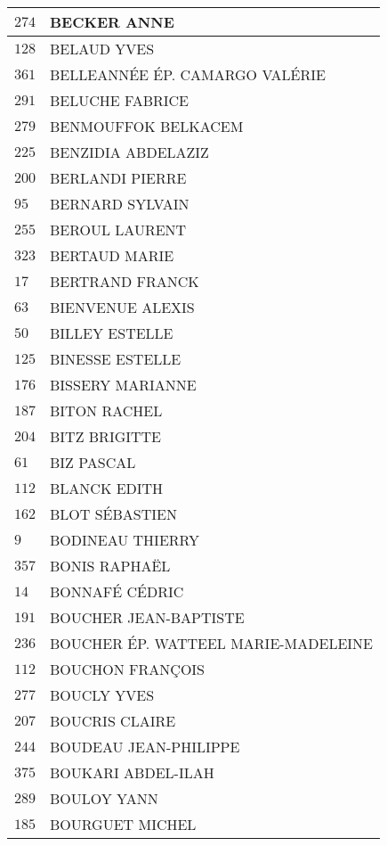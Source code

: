 \begin{xltabular}{\linewidth}{|l|X|}
    \hline
    $274$ & BECKER ANNE \\
    \hline
    $128$ & BELAUD YVES \\
    \hline
    $361$ & BELLEANNÉE ÉP. CAMARGO VALÉRIE \\
    \hline
    $291$ & BELUCHE FABRICE \\
    \hline
    $279$ & BENMOUFFOK BELKACEM \\
    \hline
    $225$ & BENZIDIA ABDELAZIZ \\
    \hline
    $200$ & BERLANDI PIERRE \\
    \hline
    $95$ & BERNARD SYLVAIN \\
    \hline
    $255$ & BEROUL LAURENT \\
    \hline
    $323$ & BERTAUD MARIE \\
    \hline
    $17$ & BERTRAND FRANCK \\
    \hline
    $63$ & BIENVENUE ALEXIS \\
    \hline
    $50$ & BILLEY ESTELLE \\
    \hline
    $125$ & BINESSE ESTELLE \\
    \hline
    $176$ & BISSERY MARIANNE \\
    \hline
    $187$ & BITON RACHEL \\
    \hline
    $204$ & BITZ BRIGITTE \\
    \hline
    $61$ & BIZ PASCAL \\
    \hline
    $112$ & BLANCK EDITH \\
    \hline
    $162$ & BLOT SÉBASTIEN \\
    \hline
    $9$ & BODINEAU THIERRY \\
    \hline
    $357$ & BONIS RAPHAËL \\
    \hline
    $14$ & BONNAFÉ CÉDRIC \\
    \hline
    $191$ & BOUCHER JEAN-BAPTISTE \\
    \hline
    $236$ & BOUCHER ÉP. WATTEEL MARIE-MADELEINE \\
    \hline
    $112$ & BOUCHON FRANÇOIS \\
    \hline
    $277$ & BOUCLY YVES \\
    \hline
    $207$ & BOUCRIS CLAIRE \\
    \hline
    $244$ & BOUDEAU JEAN-PHILIPPE \\
    \hline
    $375$ & BOUKARI ABDEL-ILAH \\
    \hline
    $289$ & BOULOY YANN \\
    \hline
    $185$ & BOURGUET MICHEL \\

\end{xltabular}

